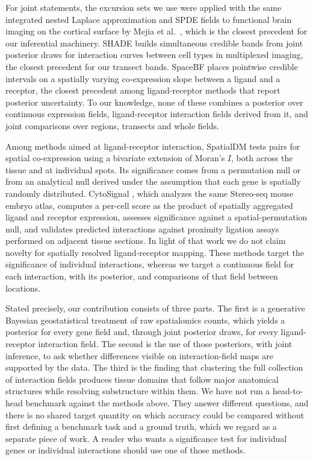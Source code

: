 \documentclass[10pt,letterpaper]{article}
\begin{document}
For joint statements, the excursion sets we use \cite{bolin2015excursion,bolin2018excursions} were applied with the same integrated nested Laplace approximation and SPDE fields to functional brain imaging on the cortical surface by Mejia et al.\ \cite{mejia2020bayesian}, which is the closest precedent for our inferential machinery. SHADE \cite{eliason2026shade} builds simultaneous credible bands from joint posterior draws for interaction curves between cell types in multiplexed imaging, the closest precedent for our transect bands. SpaceBF \cite{seal2026spacebf} places pointwise credible intervals on a spatially varying co-expression slope between a ligand and a receptor, the closest precedent among ligand-receptor methods that report posterior uncertainty. To our knowledge, none of these combines a posterior over continuous expression fields, ligand-receptor interaction fields derived from it, and joint comparisons over regions, transects and whole fields.

Among methods aimed at ligand-receptor interaction, SpatialDM \cite{Li2023} tests pairs for spatial co-expression using a bivariate extension of Moran's $I$, both across the tissue and at individual spots. Its significance comes from a permutation null or from an analytical null derived under the assumption that each gene is spatially randomly distributed. CytoSignal \cite{Liu2026}, which analyzes the same Stereo-seq mouse embryo atlas, computes a per-cell score as the product of spatially aggregated ligand and receptor expression, assesses significance against a spatial-permutation null, and validates predicted interactions against proximity ligation assays performed on adjacent tissue sections. In light of that work we do not claim novelty for spatially resolved ligand-receptor mapping. These methods target the significance of individual interactions, whereas we target a continuous field for each interaction, with its posterior, and comparisons of that field between locations.

Stated precisely, our contribution consists of three parts. The first is a generative Bayesian geostatistical treatment of raw spatialomics counts, which yields a posterior for every gene field and, through joint posterior draws, for every ligand-receptor interaction field. The second is the use of those posteriors, with joint inference, to ask whether differences visible on interaction-field maps are supported by the data. The third is the finding that clustering the full collection of interaction fields produces tissue domains that follow major anatomical structures while resolving substructure within them. We have not run a head-to-head benchmark against the methods above. They answer different questions, and there is no shared target quantity on which accuracy could be compared without first defining a benchmark task and a ground truth, which we regard as a separate piece of work. A reader who wants a significance test for individual genes or individual interactions should use one of those methods.
\end{document}
